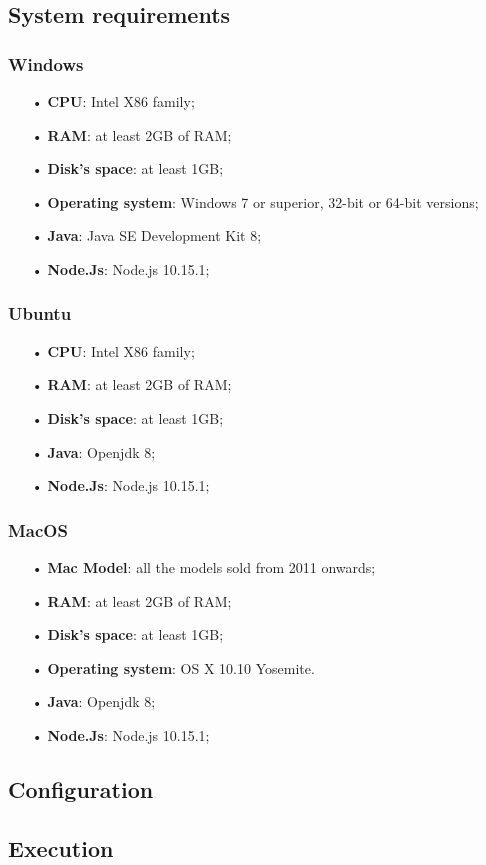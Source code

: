 \subsection{System requirements}
\subsubsection{Windows}
\begin{itemize}
\item [•]\textbf{CPU}: Intel X86 family;
\item [•]\textbf{RAM}: at least 2GB of RAM;
\item [•]\textbf{Disk's space}: at least 1GB;
\item [•]\textbf{Operating system}: Windows 7 or superior, 32-bit or 64-bit versions;
\item [•]\textbf{Java}: Java SE Development Kit 8;
\item [•]\textbf{Node.Js}: Node.js 10.15.1;


\end{itemize}

\subsubsection{Ubuntu}
\begin{itemize}
\item [•]\textbf{CPU}: Intel X86 family;
\item [•]\textbf{RAM}: at least 2GB of RAM;
\item [•]\textbf{Disk's space}: at least 1GB;
\item [•]\textbf{Java}: Openjdk 8;
\item [•]\textbf{Node.Js}: Node.js 10.15.1;

\end{itemize}

\subsubsection{MacOS}
\begin{itemize}
\item [•]\textbf{Mac Model}: all the models sold from 2011 onwards;
\item [•]\textbf{RAM}: at least 2GB of RAM;
\item [•]\textbf{Disk’s space}: at least 1GB;
\item [•]\textbf{Operating system}: OS X 10.10 Yosemite.
\item [•]\textbf{Java}: Openjdk 8;
\item [•]\textbf{Node.Js}: Node.js 10.15.1;


\end{itemize}

\subsection{Configuration}

\subsection{Execution}
